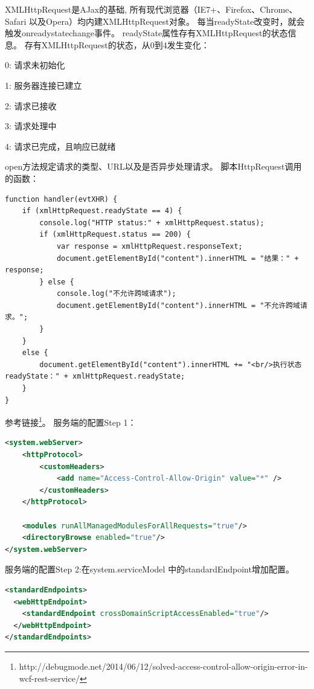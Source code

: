 \documentclass{book}
\begin{document}
XMLHttpRequest是AJax的基础,
所有现代浏览器（IE7+、Firefox、Chrome、Safari 以及Opera）均内建XMLHttpRequest对象。
每当readyState改变时，就会触发onreadystatechange事件。
readyState属性存有XMLHttpRequest的状态信息。
存有XMLHttpRequest的状态，从0到4发生变化：

0: 请求未初始化

1: 服务器连接已建立

2: 请求已接收

3: 请求处理中

4: 请求已完成，且响应已就绪

open方法规定请求的类型、URL以及是否异步处理请求。
脚本HttpRequest调用的函数：

\begin{lstlisting}[language=VBScript]
function handler(evtXHR) {  
    if (xmlHttpRequest.readyState == 4) {                
        console.log("HTTP status:" + xmlHttpRequest.status);
        if (xmlHttpRequest.status == 200) {
            var response = xmlHttpRequest.responseText;                    
            document.getElementById("content").innerHTML = "结果：" + response;
        } else {
            console.log("不允许跨域请求");
            document.getElementById("content").innerHTML = "不允许跨域请求。";
        }
    }
    else {                
        document.getElementById("content").innerHTML += "<br/>执行状态 readyState：" + xmlHttpRequest.readyState;
    }
}
\end{lstlisting}

参考链接\footnote{http://debugmode.net/2014/06/12/solved-access-control-allow-origin-error-in-wcf-rest-service/}。
服务端的配置Step 1：

\begin{lstlisting}[language=XML]
<system.webServer>
	<httpProtocol>
		<customHeaders>
			<add name="Access-Control-Allow-Origin" value="*" />
		</customHeaders>
	</httpProtocol>    
	
	<modules runAllManagedModulesForAllRequests="true"/>  
	<directoryBrowse enabled="true"/>
</system.webServer>
\end{lstlisting}

服务端的配置Step 2:在system.serviceModel 中的standardEndpoint增加配置。

\begin{lstlisting}[language=XML]
<standardEndpoints>
  <webHttpEndpoint>
    <standardEndpoint crossDomainScriptAccessEnabled="true"/>
  </webHttpEndpoint>
</standardEndpoints>
\end{lstlisting}
\end{document}
